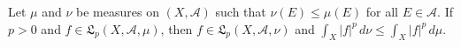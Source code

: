 Let $\mu$ and $\nu$ be measures on $(X, \mathcal{A})$ such that $\nu(E) \le \mu(E)$ for all $E \in \mathcal{A}$. If $p > 0$ and $f \in \mathfrak{L}_p(X, \mathcal{A}, \mu)$, then $f \in \mathfrak{L}_p(X, \mathcal{A}, \nu)$ and $\int_X |f|^p \, d\nu \le \int_X |f|^p \, d\mu$.
